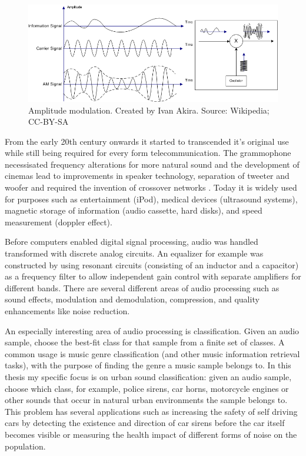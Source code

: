 \begin{figure}[h]
    \centering
	\includegraphics[width=.85\textwidth]{./images/illustrations/am}
    \caption{Amplitude modulation. Created by Ivan Akira. Source: Wikipedia; CC-BY-SA}
    \label{fig:am}
\end{figure}

From the early 20th century onwards it started to transcended it's original use while still being required for every form telecommunication. The grammophone necessisated frequency alterations for more natural sound and the development of cinemas lead to improvements in speaker technology, separation of tweeter and woofer and required the invention of crossover networks \cite{spanias2006audio}.
Today it is widely used for purposes such as entertainment (iPod), medical devices (ultrasound systems), magnetic storage of information (audio cassette, hard disks), and speed measurement (doppler effect).
 
 
Before computers enabled digital signal processing, audio was handled transformed with discrete analog circuits. An equalizer for example was constructed by using resonant circuits (consisting of an inductor and a capacitor) as a frequency filter to allow independent gain control with separate amplifiers for different bands.
There are several different areas of audio processing such as sound effects, modulation and demodulation, compression, and quality enhancements like noise reduction.

An especially interesting area of audio processing is classification.  Given an audio sample, choose the best-fit class for that sample from a finite set of classes.  A common usage is music genre classification (and other music information retrieval tasks), with the purpose of finding the genre a music sample belongs to. In this thesis my specific focus is on urban sound classification: given an audio sample, choose which class, for example, police sirens, car horns, motorcycle engines or other sounds that occur in natural urban environments the sample belongs to. This problem has several applications such as increasing the safety of self driving cars by detecting the existence and direction of car sirens before the car itself becomes visible or measuring the health impact of different forms of noise on the population.

